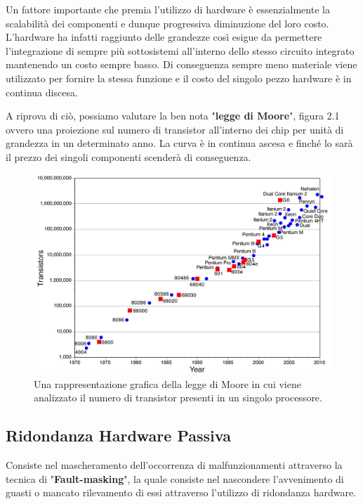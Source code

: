 \documentclass[LaM,binding=0.6cm]{../sapthesis}
\begin{document}
Un fattore importante che premia l'utilizzo di hardware è essenzialmente la scalabilità dei componenti e dunque progressiva diminuzione del loro costo. L'hardware ha infatti raggiunto delle grandezze così esigue da permettere l'integrazione di sempre più sottosistemi all'interno dello stesso circuito integrato mantenendo un costo sempre basso. Di conseguenza sempre meno materiale viene utilizzato per fornire la stessa funzione e il costo del singolo pezzo hardware è in continua discesa.

A riprova di ciò, possiamo valutare la ben nota "\textbf{legge di Moore}", figura 2.1 ovvero una proiezione sul numero di transistor all'interno dei chip per unità di grandezza in un determinato anno. La curva è in continua ascesa e finché lo sarà il prezzo dei singoli componenti scenderà di conseguenza.

    \begin{figure}[htbp]
    \centerline{\includegraphics[scale=.27]{examples/Moores_Law.jpg}}
    \caption{Una rappresentazione grafica della legge di Moore in cui viene analizzato il numero di transistor presenti in un singolo processore.}
    \label{fig}
    \end{figure}
\newline

\subsection{Ridondanza Hardware Passiva}

Consiste nel mascheramento dell'occorrenza di malfunzionamenti attraverso la tecnica di "\textbf{Fault-masking}", la quale consiste nel nascondere l'avvenimento di guasti o mancato rilevamento di essi attraverso l'utilizzo di ridondanza hardware. 
\end{document}

